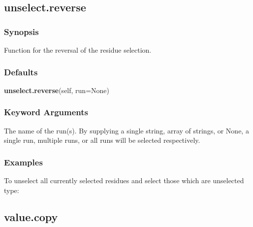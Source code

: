 






\newpage

\subsection{unselect.reverse}


\subsubsection{Synopsis}

Function for the reversal of the residue selection.



\subsubsection{Defaults}

\textsf{\textbf{unselect.reverse}(self, run=None)}


\subsubsection{Keyword Arguments}

  The name of the run(s).  By supplying a single string, array of strings, or None, a single run, multiple runs, or all runs will be selected respectively. 




\subsubsection{Examples}

To unselect all currently selected residues and select those which are unselected type:





\newpage

\subsection{value.copy}


